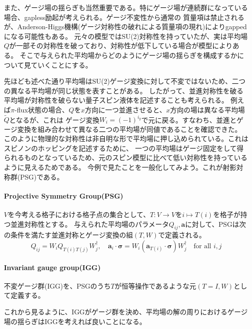 \documentclass[11pt, aps, longbibliography]{article}
\begin{document}
    また、ゲージ場の揺らぎも当然重要である。特にゲージ場が連続群になっている場合、gapless励起が考えられる。ゲージ不変性から通常の
    質量項は禁止されるが、Anderson-Higgs機構(ゲージ対称性の破れによる質量項の現れ)によりgappedになる可能性もある。
    元々の模型ではSU(2)対称性を持っていたが、実は平均場$Q$が一部その対称性を破っており、対称性が低下している場合が模型によりある。
    そこで与えられた平均場からどのようにゲージ場の揺らぎを構成するかについて見ていくことにする。

    先ほども述べた通り平均場はSU(2)ゲージ変換に対して不変ではないため、二つの異なる平均場が同じ状態を表すことがある。
    したがって、並進対称性を破る平均場が対称性を破らない量子スピン液体を記述することも考えられる。
    例えば$\pi$-flux状態の場合、$Q$を$x$方向に一つ並進させると、$x$方向の場は異なる平均場$\tilde{Q}$となるが、これは
    ゲージ変換$W_i = (-1)^{i_y}$で元に戻る。すなわち、並進とゲージ変換を組み合わせて異なる二つの平均場が同値であることを確認できた。
    このように物理的な対称性は非自明な形で平均場に押し込められている。これはスピノンのホッピングを記述するために、
    一つの平均場はゲージ固定をして得られるものとなっているため、元のスピン模型に比べて低い対称性を持っているように見えるためである。
    今例で見たことを一般化してみよう。これが射影対称群(PSG)である。

    \begin{tcolorbox}
        \paragraph{Projective Symmetry Group(PSG)}
        $V$を今考える格子における格子点の集合として、$T:V\rightarrow V$を$i \mapsto T(i)$を格子が持つ並進対称性とする。
        与えられた平均場のパラメータ${Q_{ij}, \boldsymbol{a}}$に対して、PSGは次の条件を満たす並進対称とゲージ変換の組$(T,W)$で定義される。
        \begin{equation}\label{eq:3-4-1}
            Q_{ij} = W_iQ_{T(i)T(j)}W_j^\dagger, \quad \boldsymbol{a}_i\cdot \boldsymbol{\sigma} = W_i (\boldsymbol{a}_{T(i)}\cdot \boldsymbol{\sigma})W_j^\dagger \quad \text{for all }i,j
        \end{equation}
    \end{tcolorbox}

    \begin{tcolorbox}
        \paragraph{Invariant gauge group(IGG)}
        不変ゲージ群(IGG)を、PSGのうち$T$が恒等操作であるような元$(T=I,W)$として定義する。
    \end{tcolorbox}
    これから見るように、IGGがゲージ群を決め、平均場の解の周りにおけるゲージ場の揺らぎはIGGを考えれば良いことになる。
\end{document}
